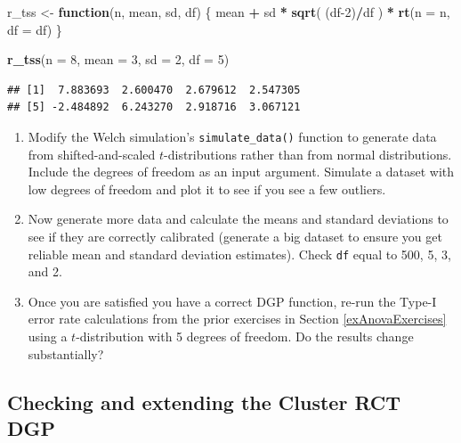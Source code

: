 \documentclass[
]{book}
\newenvironment{Shaded}{\begin{snugshade}}{\end{snugshade}}
\newcommand{\AttributeTok}[1]{\textcolor[rgb]{0.13,0.29,0.53}{#1}}
\newcommand{\ControlFlowTok}[1]{\textcolor[rgb]{0.13,0.29,0.53}{\textbf{#1}}}
\newcommand{\DecValTok}[1]{\textcolor[rgb]{0.00,0.00,0.81}{#1}}
\newcommand{\FunctionTok}[1]{\textcolor[rgb]{0.13,0.29,0.53}{\textbf{#1}}}
\newcommand{\NormalTok}[1]{#1}
\newcommand{\OtherTok}[1]{\textcolor[rgb]{0.56,0.35,0.01}{#1}}
\newcommand{\SpecialCharTok}[1]{\textcolor[rgb]{0.81,0.36,0.00}{\textbf{#1}}}
\begin{document}
\begin{Shaded}
\begin{Highlighting}[]
\NormalTok{r\_tss }\OtherTok{\textless{}{-}} \ControlFlowTok{function}\NormalTok{(n, mean, sd, df) \{}
\NormalTok{  mean }\SpecialCharTok{+}\NormalTok{ sd }\SpecialCharTok{*} \FunctionTok{sqrt}\NormalTok{( (df}\DecValTok{{-}2}\NormalTok{)}\SpecialCharTok{/}\NormalTok{df ) }\SpecialCharTok{*} \FunctionTok{rt}\NormalTok{(}\AttributeTok{n =}\NormalTok{ n, }\AttributeTok{df =}\NormalTok{ df)}
\NormalTok{\}}

\FunctionTok{r\_tss}\NormalTok{(}\AttributeTok{n =} \DecValTok{8}\NormalTok{, }\AttributeTok{mean =} \DecValTok{3}\NormalTok{, }\AttributeTok{sd =} \DecValTok{2}\NormalTok{, }\AttributeTok{df =} \DecValTok{5}\NormalTok{)}
\end{Highlighting}
\end{Shaded}

\begin{verbatim}
## [1]  7.883693  2.600470  2.679612  2.547305
## [5] -2.484892  6.243270  2.918716  3.067121
\end{verbatim}

\begin{enumerate}
\def\labelenumi{\arabic{enumi}.}
\item
  Modify the Welch simulation's \texttt{simulate\_data()} function to generate data from shifted-and-scaled \(t\)-distributions rather than from normal distributions. Include the degrees of freedom as an input argument.
  Simulate a dataset with low degrees of freedom and plot it to see if you see a few outliers.
\item
  Now generate more data and calculate the means and standard deviations to see if they are correctly calibrated (generate a big dataset to ensure you get reliable mean and standard deviation estimates). Check \texttt{df} equal to 500, 5, 3, and 2.
\item
  Once you are satisfied you have a correct DGP function, re-run the Type-I error rate calculations from the prior exercises in Section \ref{exAnovaExercises} using a \(t\)-distribution with 5 degrees of freedom.
  Do the results change substantially?
\end{enumerate}

\subsection{Checking and extending the Cluster RCT DGP}\label{checking-and-extending-the-cluster-rct-dgp}
\end{document}
